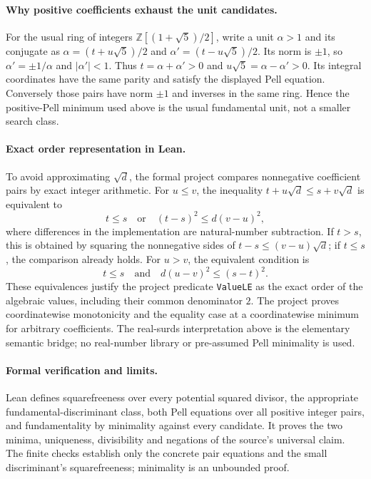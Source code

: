 \documentclass[11pt]{article}
\begin{document}
\paragraph{Why positive coefficients exhaust the unit candidates.}
For the usual ring of integers $\mathbb Z[(1+\sqrt5)/2]$, write a unit
$\alpha>1$ and its conjugate as
$\alpha=(t+u\sqrt5)/2$ and $\alpha'=(t-u\sqrt5)/2$.
Its norm is $\pm1$, so $\alpha'=\pm1/\alpha$ and $|\alpha'|<1$.
Thus $t=\alpha+\alpha'>0$ and $u\sqrt5=\alpha-\alpha'>0$.
Its integral coordinates have the same parity and satisfy the
displayed Pell equation. Conversely those pairs have norm $\pm1$
and inverses in the same ring. Hence the positive-Pell minimum used
above is the usual fundamental unit, not a smaller search class.

\paragraph{Exact order representation in Lean.}
To avoid approximating $\sqrt d$, the formal project compares
nonnegative coefficient pairs by exact integer arithmetic.
For $u\leq v$, the inequality
$t+u\sqrt d\leq s+v\sqrt d$ is equivalent to
\[
 t\leq s\quad\text{or}\quad (t-s)^2\leq d(v-u)^2,
\]
where differences in the implementation are natural-number subtraction.
If $t>s$, this is obtained by squaring the nonnegative sides of
$t-s\leq(v-u)\sqrt d$; if $t\leq s$, the comparison already holds.
For $u>v$, the equivalent condition is
\[
 t\leq s\quad\text{and}\quad d(u-v)^2\leq(s-t)^2.
\]
These equivalences justify the project predicate \texttt{ValueLE}
as the exact order of the algebraic values, including their common
denominator $2$. The project proves coordinatewise monotonicity
and the equality case at a coordinatewise minimum for arbitrary
coefficients. The real-surds interpretation above is the elementary
semantic bridge; no real-number library or pre-assumed Pell
minimality is used.

\paragraph{Formal verification and limits.}
Lean defines squarefreeness over every potential squared divisor,
the appropriate fundamental-discriminant class, both Pell equations
over all positive integer pairs, and fundamentality by minimality
against every candidate. It proves the two minima, uniqueness,
divisibility and negations of the source's universal claim.
The finite checks establish only the concrete pair equations and
the small discriminant's squarefreeness; minimality is an unbounded proof.
\end{document}
